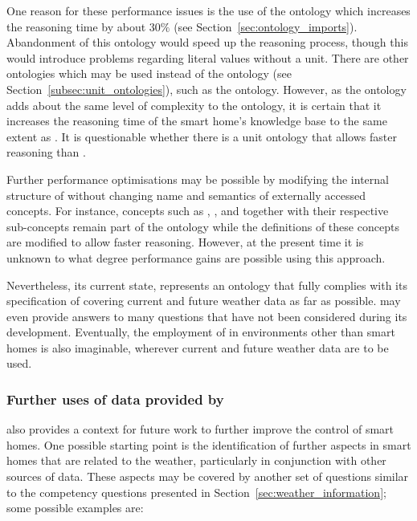 One reason for these performance issues is the use of the \muo ontology which increases the reasoning time by about $30 \%$ (see Section~\ref{sec:ontology_imports}). Abandonment of this ontology would speed up the reasoning process, though this would introduce problems regarding literal values without a unit. There are other ontologies which may be used instead of the \muo ontology (see Section~\ref{subsec:unit_ontologies}), such as the  ontology. However, as the  ontology adds about the same level of complexity to the ontology, it is certain that it increases the reasoning time of the smart home's knowledge base to the same extent as \muo. It is questionable whether there is a unit ontology that allows faster reasoning than \muo.

Further performance optimisations may be possible by modifying the internal structure of \smarthomeweather without changing name and semantics of externally accessed concepts. For instance, concepts such as , , and  together with their respective sub-concepts remain part of the ontology while the definitions of these concepts are modified to allow faster reasoning. However, at the present time it is unknown to what degree performance gains are possible using this approach.

Nevertheless, its current state, \smarthomeweather represents an ontology that fully complies with its specification of covering current and future weather data as far as possible. \smarthomeweather may even provide answers to many questions that have not been considered during its development. Eventually, the employment of \smarthomeweather in environments other than smart homes is also imaginable, wherever current and future weather data are to be used.

\subsubsection{Further uses of data provided by \smarthomeweather}

\smarthomeweather also provides a context for future work to further improve the control of smart homes. One possible starting point is the identification of further aspects in smart homes that are related to the weather, particularly in conjunction with other sources of data. These aspects may be covered by another set of questions similar to the competency questions presented in Section~\ref{sec:weather_information}; some possible examples are:

